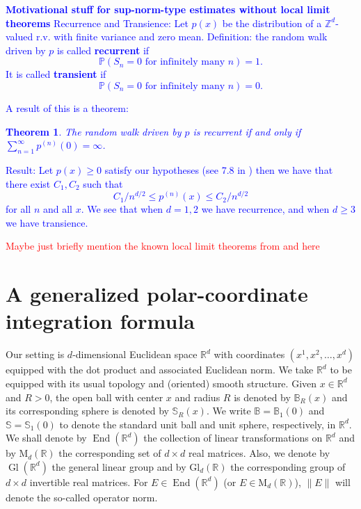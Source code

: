 \documentclass[11pt, letter]{book}
\newtheorem{theorem}{Theorem}[section]
\newcommand\MdR{\mbox{M}_d(\mathbb{R})} %
\newcommand\End{\operatorname{End}} %
\newcommand\GldR{\mbox{Gl}_d(\mathbb{R})}%
\newcommand\Gl{\operatorname{Gl}} %
\begin{document}
\textcolor{blue}{
\begin{framed}
\textbf{Motivational stuff for sup-norm-type estimates without local limit theorems}
Recurrence and Transience: Let $p(x)$ be the distribution of a  $\mathbb{Z}^d$-valued r.v. with finite variance and zero mean. Definition: the random walk driven by $p$ is called \textbf{recurrent} if
\begin{equation*}
    \mathbb{P}(S_n = 0 \text{ for infinitely many } n ) = 1.
\end{equation*}
It is called \textbf{transient} if
\begin{equation*}
    \mathbb{P}(S_n = 0 \text{ for infinitely many } n ) = 0.
\end{equation*}
\end{framed}
A result of this is a theorem:
\begin{theorem}
The random walk driven by $p$ is recurrent if and only if $\sum_{n=1}^\infty p^{(n)}(0) = \infty$.
\end{theorem}
Result: Let $p(x) \geq 0$ satisfy our hypotheses (see 7.8 in \cite{randles_convolution_2017}) then we have that there exist $C_1, C_2$ such that 
\begin{equation*}
    C_1/n^{d/2} \leq p^{(n)}(x) \leq C_2/n^{d/2}
\end{equation*}
for all $n$ and all $x$. We see that when $d=1,2$ we have recurrence, and when $d\geq 3$ we have transience. 
}





\textcolor{red}{Maybe just briefly mention the known local limit theorems from \cite{randles_convolution_2015} and \cite{randles_convolution_2017} here}



\section{A generalized polar-coordinate integration formula}


Our setting is $d$-dimensional Euclidean space $\mathbb{R}^d$ with coordinates $(x^1,x^2,\dots,x^d)$ equipped with the dot product and associated Euclidean norm. We take $\mathbb{R}^d$ to be equipped with its usual topology and (oriented) smooth structure. Given $x\in\mathbb{R}^d$ and $R>0$, the open ball with center $x$ and radius $R$ is denoted by $\mathbb{B}_R(x)$ and its corresponding sphere is denoted by $\mathbb{S}_R(x)$. We write $\mathbb{B}=\mathbb{B}_1(0)$ and $\mathbb{S}=\mathbb{S}_1(0)$ to denote the standard unit ball and unit sphere, respectively, in $\mathbb{R}^d$. We shall denote by $\End(\mathbb{R}^d)$ the collection of linear transformations on $\mathbb{R}^d$ and by $\MdR$ the corresponding set of $d\times d$ real matrices. Also, we denote by $\Gl(\mathbb{R}^d)$ the general linear group and by $\GldR$ the corresponding group of $d\times d$ invertible real matrices. For $E\in \End(\mathbb{R}^d)$ (or $E\in\MdR$), $\|E\|$ will denote the so-called operator norm.\\
\end{document}
